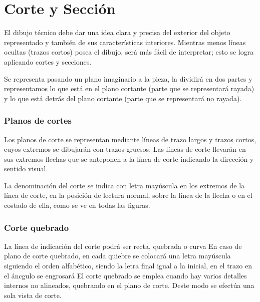 \documentclass[../main]{subfiles}
\begin{document}
\section{Corte y Sección}


 El dibujo técnico debe dar una idea clara y precisa del exterior del objeto representado y también de sus características interiores. Mientras menos líneas ocultas (trazos cortos) posea el dibujo, será más fácil de interpretar; esto se logra aplicando cortes y secciones.


Se representa pasando un plano imaginario a la pieza, la dividirá en dos partes y representamos lo que está en el plano cortante (parte que se representará rayada) y lo que está detrás del plano cortante (parte que se representará no rayada).


\subsubsection{Planos de cortes}


Los planos de corte se representan mediante líneas de trazo largos y trazos cortos, cuyos extremos se dibujarán con trazos gruesos. Las líneas de corte llevarán en sus extremos flechas que se anteponen a la línea de corte indicando la dirección y sentido visual.

La denominación del corte se indica con letra mayúscula en los extremos de la línea de corte, en la posición de lectura normal, sobre la línea de la flecha o en el costado de ella, como se ve en todas las figuras.

\subsubsection{Corte quebrado}
La línea de indicación del corte podrá ser recta, quebrada o curva En caso de plano de corte quebrado, en cada quiebre se colocará una letra mayúscula siguiendo el orden alfabético, siendo la letra final igual a la inicial, en el trazo en el áncgulo se engrosará El corte quebrado se emplea cuando hay varios detalles internos no alineados, quebrando en el plano de corte. Deste modo se efectúa una sola vista de corte.

\end{document}
